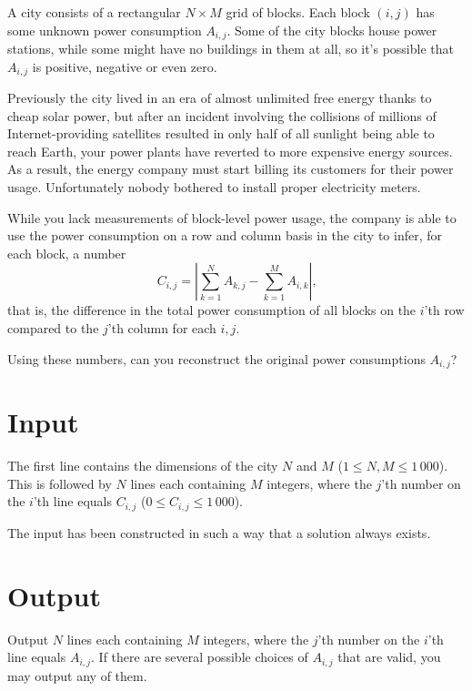 A city consists of a rectangular $N \times M$ grid of blocks.
Each block $(i, j)$ has some unknown power consumption $A_{i, j}$.
Some of the city blocks house power stations, while some might have no buildings in them at all, so it's possible that $A_{i, j}$ is positive, negative or even zero.

Previously the city lived in an era of almost unlimited free energy thanks to cheap solar power, but after an incident involving the collisions of millions of Internet-providing satellites resulted in only half of all sunlight being able to reach Earth, your power plants have reverted to more expensive energy sources.
As a result, the energy company must start billing its customers for their power usage.
Unfortunately nobody bothered to install proper electricity meters.

While you lack measurements of block-level power usage, the company is able to use the power consumption on a row and column basis in the city to infer, for each block, a number
$$C_{i, j} = \left| \sum_{k=1}^N A_{k, j} - \sum_{k=1}^M A_{i, k} \right| \text{,}$$
that is, the difference in the total power consumption of all blocks on the $i$'th row compared to the $j$'th column for each $i, j$.

Using these numbers, can you reconstruct the original power consumptions $A_{i, j}$?

\section*{Input}
The first line contains the dimensions of the city $N$ and $M$ ($1 \le N, M \le 1\,000$).
This is followed by $N$ lines each containing $M$ integers, where the $j$'th number on the $i$'th line equals $C_{i, j}$ ($0 \le C_{i, j} \le 1\,000$).

The input has been constructed in such a way that a solution always exists.

\section*{Output}
Output $N$ lines each containing $M$ integers, where the $j$'th number on the $i$'th line equals $A_{i, j}$.
If there are several possible choices of $A_{i, j}$ that are valid, you may output any of them.

